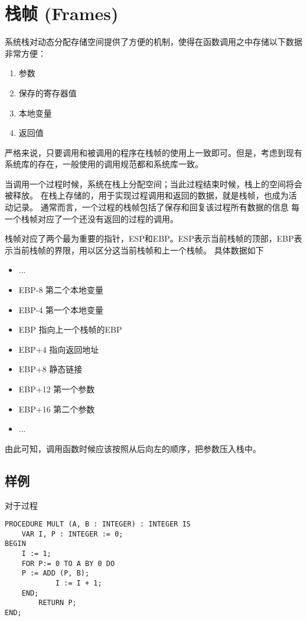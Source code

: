 ﻿\documentclass{article}
\begin{document}
\section{栈帧 (Frames)}
系统栈对动态分配存储空间提供了方便的机制，使得在函数调用之中存储以下数据非常方便：
\begin{enumerate}
\item 参数
\item 保存的寄存器值
\item 本地变量
\item 返回值
\end{enumerate}
严格来说，只要调用和被调用的程序在栈帧的使用上一致即可。但是，考虑到现有系统库的存在，一般使用的调用规范都和系统库一致。

当调用一个过程时候，系统在栈上分配空间；当此过程结束时候，栈上的空间将会被释放。
在栈上存储的，用于实现过程调用和返回的数据，就是栈帧，也成为活动记录。
通常而言，一个过程的栈帧包括了保存和回复该过程所有数据的信息
每一个栈帧对应了一个还没有返回的过程的调用。

栈帧对应了两个最为重要的指针，ESP和EBP。ESP表示当前栈帧的顶部，EBP表示当前栈帧的界限，用以区分这当前栈帧和上一个栈帧。
具体数据如下
\begin{itemize}
\item ...
\item{EBP-8} 第二个本地变量
\item{EBP-4} 第一个本地变量
\item{EBP} 指向上一个栈帧的EBP
\item{EBP+4} 指向返回地址
\item{EBP+8} 静态链接
\item{EBP+12} 第一个参数
\item{EBP+16} 第二个参数
\item ...
\end{itemize}

由此可知，调用函数时候应该按照从后向左的顺序，把参数压入栈中。

\subsection{样例}
对于过程
\begin{lstlisting}
PROCEDURE MULT (A, B : INTEGER) : INTEGER IS
    VAR I, P : INTEGER := 0;
BEGIN
    I := 1;
    FOR P:= 0 TO A BY 0 DO
    P := ADD (P, B);
            I := I + 1;
    END;
        RETURN P;
END;
\end{lstlisting}
\end{document}
